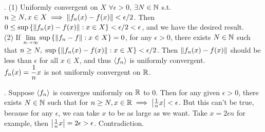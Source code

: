 \pf. (1) Uniformly convergent on \(X\) \mimp \(\forall \epsilon > 0\), \(\exists N \in \mathbb{N}\) s.t. \(n \geq N, x\in X \implies \left\lVert f_n(x) - f(x)\right\rVert < \epsilon/2\). Then \(0 \leq \sup\left\{\left\lVert f_n(x) - f(x)\right\rVert : x \in X \right\} < \epsilon/2 < \epsilon\), and we have the desired result.
\\
(2) If \(\displaystyle \lim_{n\rightarrow \infty} \sup \left\{\left\lVert f_n-f\right\rVert: x\in X\right\} = 0\), for any \(\epsilon > 0\), there exists \(N\in \mathbb{N}\) such that \(n\geq N,\; \sup\left\{\left\lVert f_n(x) - f(x)\right\rVert : x \in X \right\} < \epsilon / 2\). Then \(\left\lVert f_n(x) - f(x)\right\rVert\) should be less than \(\epsilon\) for all \(x\in X\), and thus \(\left\langle f_n \right\rangle\) is uniformly convergent.
\\

 \(\displaystyle f_n(x) = \frac{1}{n}x\) is not uniformly convergent on \(\mathbb{R}\).

\pf. Suppose \(\left\langle f_n \right\rangle\) is converges uniformly on \(\mathbb{R}\) to 0. Then for any given \(\epsilon > 0\), there exists \(N\in\mathbb{N}\) such that for \(n\geq N, x\in \mathbb{R} \implies \left|\frac{1}{n}x\right| < \epsilon\). But this can't be true, because for any \(\epsilon\), we can take \(x\) to be as large as we want. Take \(x = 2\epsilon n\) for example, then \(\left|\frac{1}{n}x\right| = 2\epsilon > \epsilon\). Contradiction.
